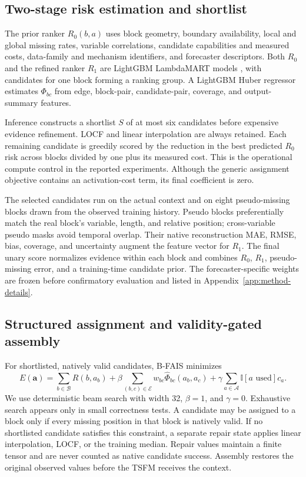 \documentclass{article}
\newcommand{\bfais}{\textsc{B-FAIS}\xspace}
\begin{document}
\subsection{Two-stage risk estimation and shortlist}

The prior ranker $R_0(b,a)$ uses block geometry, boundary availability, local and global missing rates, variable correlations, candidate capabilities and measured costs, data-family and mechanism identifiers, and forecaster descriptors. Both $R_0$ and the refined ranker $R_1$ are LightGBM LambdaMART models \citep{burges2010lambdamart,ke2017lightgbm}, with candidates for one block forming a ranking group. A LightGBM Huber regressor estimates $\Phi_{bc}$ from edge, block-pair, candidate-pair, coverage, and output-summary features.

Inference constructs a shortlist $S$ of at most six candidates before expensive evidence refinement. LOCF and linear interpolation are always retained. Each remaining candidate is greedily scored by the reduction in the best predicted $R_0$ risk across blocks divided by one plus its measured cost. This is the operational compute control in the reported experiments. Although the generic assignment objective contains an activation-cost term, its final coefficient is zero.

The selected candidates run on the actual context and on eight pseudo-missing blocks drawn from the observed training history. Pseudo blocks preferentially match the real block's variable, length, and relative position; cross-variable pseudo masks avoid temporal overlap. Their native reconstruction MAE, RMSE, bias, coverage, and uncertainty augment the feature vector for $R_1$. The final unary score normalizes evidence within each block and combines $R_0$, $R_1$, pseudo-missing error, and a training-time candidate prior. The forecaster-specific weights are frozen before confirmatory evaluation and listed in Appendix~\ref{app:method-details}.

\subsection{Structured assignment and validity-gated assembly}

For shortlisted, natively valid candidates, \bfais minimizes
\begin{equation}
E(\mathbf a)=\sum_{b\in\mathcal B}R(b,a_b)
+\beta\!\sum_{(b,c)\in\mathcal E}w_{bc}\widehat\Phi_{bc}(a_b,a_c)
+\gamma\!\sum_{a\in\mathcal A}\mathbb I[a\text{ used}]c_a.
\label{eq:energy}
\end{equation}
We use deterministic beam search with width 32, $\beta=1$, and $\gamma=0$. Exhaustive search appears only in small correctness tests. A candidate may be assigned to a block only if every missing position in that block is natively valid. If no shortlisted candidate satisfies this constraint, a separate repair state applies linear interpolation, LOCF, or the training median. Repair values maintain a finite tensor and are never counted as native candidate success. Assembly restores the original observed values before the TSFM receives the context.
\end{document}
